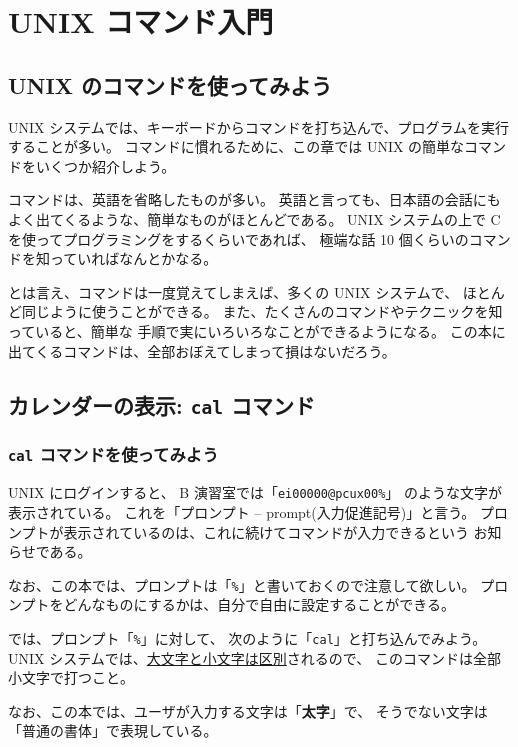 \chapter{UNIX コマンド入門}

\section*{UNIX のコマンドを使ってみよう}

 UNIX システムでは、キーボードからコマンドを打ち込んで、プログラムを実行することが多い。
コマンドに慣れるために、この章では UNIX の簡単なコマンドをいくつか紹介しよう。

コマンドは、英語を省略したものが多い。
英語と言っても、日本語の会話にもよく出てくるような、簡単なものがほとんどである。
 UNIX システムの上で C を使ってプログラミングをするくらいであれば、
極端な話 10 個くらいのコマンドを知っていればなんとかなる。

とは言え、コマンドは一度覚えてしまえば、多くの UNIX システムで、
ほとんど同じように使うことができる。
また、たくさんのコマンドやテクニックを知っていると、簡単な
手順で実にいろいろなことができるようになる。
この本に出てくるコマンドは、全部おぼえてしまって損はないだろう。

\section{カレンダーの表示: \texttt{cal} コマンド}

\subsection{\texttt{cal} コマンドを使ってみよう}

UNIX にログインすると、 B 演習室では「\texttt{ei00000@pcux00\%}」
のような文字が表示されている。
これを「プロンプト -- prompt(入力促進記号)」と言う。
プロンプトが表示されているのは、これに続けてコマンドが入力できるという
お知らせである。

なお、この本では、プロンプトは「\texttt{\%}」と書いておくので注意して欲しい。
プロンプトをどんなものにするかは、自分で自由に設定することができる。

\bigskip

では、プロンプト「\texttt{\%}」に対して、
次のように「\texttt{cal}\retrn」と打ち込んでみよう。
 UNIX システムでは、\underline{大文字と小文字は区別}されるので、
このコマンドは全部小文字で打つこと。

なお、この本では、ユーザが入力する文字は「\textbf{太字}」で、
そうでない文字は「普通の書体」で表現している。

